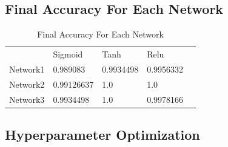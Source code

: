 \documentclass{article}
\begin{document}
\subsection{Final Accuracy For Each Network}

\begin{table}[H]
\centering
\caption{Final Accuracy For Each Network}
\begin{tabular}{|l|l|l|l|l}
\cline{1-4}
         & Sigmoid    & Tanh      & Relu      &  \\ \cline{1-4}
Network1 & 0.989083   & 0.9934498 & 0.9956332 &  \\ \cline{1-4}
Network2 & 0.99126637 & 1.0       & 1.0       &  \\ \cline{1-4}
Network3 & 0.9934498  & 1.0       & 0.9978166 &  \\ \cline{1-4}
\end{tabular}
\end{table}

\subsection{Hyperparameter Optimization}
\end{document}
